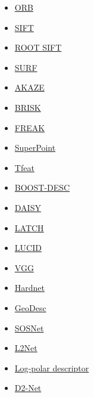 \documentclass{article}
\begin{document}
\begin{itemize}
    \item \href{http://www.willowgarage.com/sites/default/files/orb_final.pdf}{ORB} \cite{rublee2011orb}
    \item \href{https://www.cs.ubc.ca/~lowe/papers/iccv99.pdf}{SIFT} \cite{lowe1999object}
    \item \href{https://www.robots.ox.ac.uk/~vgg/publications/2012/Arandjelovic12/arandjelovic12.pdf}{ROOT SIFT}
    \item \href{http://people.ee.ethz.ch/~surf/eccv06.pdf}{SURF} \cite{bay2006surf}
    \item \href{http://www.bmva.org/bmvc/2013/Papers/paper0013/paper0013.pdf}{AKAZE} \cite{alcantarilla2013fast}
    \item \href{http://www.margaritachli.com/papers/ICCV2011paper.pdf}{BRISK} \cite{leutenegger2011brisk}
    \item \href{https://www.researchgate.net/publication/258848394_FREAK_Fast_retina_keypoint}{FREAK}
    \item \href{https://github.com/MagicLeapResearch/SuperPointPretrainedNetwork}{SuperPoint}
    \item \href{https://github.com/vbalnt/tfeat}{Tfeat}
    \item \href{https://www.labri.fr/perso/vlepetit/pubs/trzcinski_pami15.pdf}{BOOST-DESC} \cite{trzcinski2013boosting}
    \item \href{https://ieeexplore.ieee.org/document/4815264}{DAISY} \cite{tola2010daisy}
    \item \href{https://arxiv.org/abs/1501.03719}{LATCH} \cite{levi2006latch}
    \item \href{https://pdfs.semanticscholar.org/85bd/560cdcbd4f3c24a43678284f485eb2d712d7.pdf}{LUCID}
    \item \href{https://www.robots.ox.ac.uk/~vedaldi/assets/pubs/simonyan14learning.pdf}{VGG} \cite{simonyan2014learning}
    \item \href{https://github.com/DagnyT/hardnet.git}{Hardnet} \cite{mishchuk2017working}
    \item \href{https://github.com/lzx551402/geodesc.git}{GeoDesc} \cite{verdie2018tilde}
    \item \href{https://github.com/yuruntian/SOSNet.git}{SOSNet}
    \item \href{https://github.com/yuruntian/L2-Net}{L2Net}
    \item \href{https://github.com/cvlab-epfl/log-polar-descriptors}{Log-polar descriptor}
    \item \href{https://github.com/mihaidusmanu/d2-net}{D2-Net} \cite{dusmanu2019d2}

\end{itemize}
\end{document}
